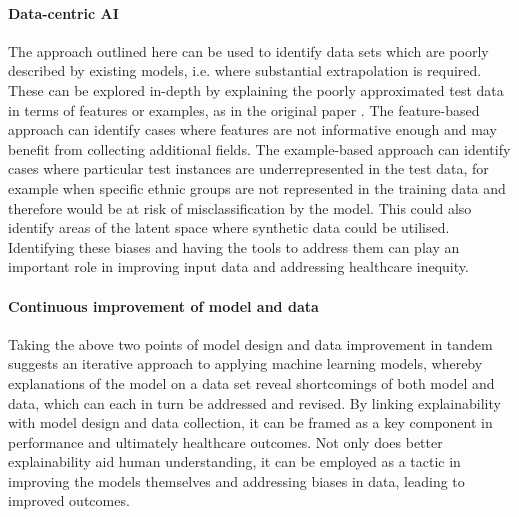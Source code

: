 \documentclass{article}
\begin{document}
\paragraph{Data-centric AI}
The approach outlined here can be used to identify data sets which are poorly described by existing models, i.e. where substantial extrapolation is required.
These can be explored in-depth by explaining the poorly approximated test data in terms of features or examples, as in the original paper \cite{crabbe_explaining_2021}.
The feature-based approach can identify cases where features are not informative enough and may benefit from collecting additional fields.
The example-based approach can identify cases where particular test instances are underrepresented in the test data, for example when specific ethnic groups are not represented in the training data and therefore would be at risk of misclassification by the model.
This could also identify areas of the latent space where synthetic data could be utilised.
Identifying these biases and having the tools to address them can play an important role in improving input data and addressing healthcare inequity.

\paragraph{Continuous improvement of model and data}
Taking the above two points of model design and data improvement in tandem suggests an iterative approach to applying machine learning models, whereby explanations of the model on a data set reveal shortcomings of both model and data, which can each in turn be addressed and revised.
By linking explainability with model design and data collection, it can be framed as a key component in performance and ultimately healthcare outcomes. Not only does better explainability aid human understanding, it can be employed as a tactic in improving the models themselves and addressing biases in data, leading to improved outcomes.



\clearpage





\end{document}
